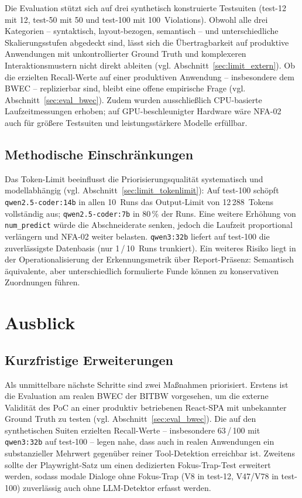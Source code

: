 Die Evaluation stützt sich auf drei synthetisch konstruierte Testsuiten (test-12 mit 12, test-50 mit 50 und test-100 mit 100~Violations). Obwohl alle drei Kategorien -- syntaktisch, layout-bezogen, semantisch -- und unterschiedliche Skalierungsstufen abgedeckt sind, lässt sich die Übertragbarkeit auf produktive Anwendungen mit unkontrollierter Ground Truth und komplexeren Interaktionsmustern nicht direkt ableiten (vgl. Abschnitt~\ref{sec:limit_extern}). Ob die erzielten Recall-Werte auf einer produktiven Anwendung -- insbesondere dem \ac{BWEC} -- replizierbar sind, bleibt eine offene empirische Frage (vgl. Abschnitt~\ref{sec:eval_bwec}). Zudem wurden ausschließlich \ac{CPU}-basierte Laufzeitmessungen erhoben; auf \ac{GPU}-beschleunigter Hardware wäre \ac{NFA}-02 auch für größere Testsuiten und leistungsstärkere Modelle erfüllbar.

\subsection{Methodische Einschränkungen}
\label{sec:fazit_intern}

Das Token-Limit beeinflusst die Priorisierungsqualität systematisch und modellabhängig (vgl. Abschnitt~\ref{sec:limit_tokenlimit}): Auf test-100 schöpft \texttt{qwen2.5-coder:14b} in allen 10~Runs das Output-Limit von 12\,288~Tokens vollständig aus; \texttt{qwen2.5-coder:7b} in 80\,\% der Runs. Eine weitere Erhöhung von \texttt{num\_predict} würde die Abschneiderate senken, jedoch die Laufzeit proportional verlängern und \ac{NFA}-02 weiter belasten. \texttt{qwen3:32b} liefert auf test-100 die zuverlässigste Datenbasis (nur 1\,/\,10~Runs trunkiert). Ein weiteres Risiko liegt in der Operationalisierung der Erkennungsmetrik über Report-Präsenz: Semantisch äquivalente, aber unterschiedlich formulierte Funde können zu konservativen Zuordnungen führen.

\section{Ausblick}
\label{sec:fazit_ausblick}

\subsection{Kurzfristige Erweiterungen}
\label{sec:ausblick_kurz}

Als unmittelbare nächste Schritte sind zwei Maßnahmen priorisiert. Erstens ist die Evaluation am realen \ac{BWEC} der \ac{BITBW} vorgesehen, um die externe Validität des \ac{PoC} an einer produktiv betriebenen React-\ac{SPA} mit unbekannter Ground Truth zu testen (vgl. Abschnitt~\ref{sec:eval_bwec}). Die auf den synthetischen Suiten erzielten Recall-Werte -- insbesondere 63\,/\,100 mit \texttt{qwen3:32b} auf test-100 -- legen nahe, dass auch in realen Anwendungen ein substanzieller Mehrwert gegenüber reiner Tool-Detektion erreichbar ist. Zweitens sollte der Playwright-Satz um einen dedizierten Fokus-Trap-Test erweitert werden, sodass modale Dialoge ohne Fokus-Trap (V8 in test-12, V47/V78 in test-100) zuverlässig auch ohne \ac{LLM}-Detektor erfasst werden.

